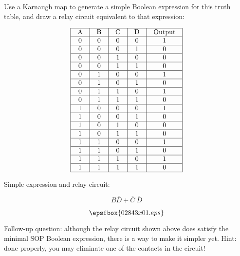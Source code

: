 

Use a Karnaugh map to generate a simple Boolean expression for this truth table, and draw a relay circuit equivalent to that expression:


$$\vbox{\offinterlineskip
\halign{\strut
\vrule \quad\hfil # \ \hfil & 
\vrule \quad\hfil # \ \hfil & 
\vrule \quad\hfil # \ \hfil & 
\vrule \quad\hfil # \ \hfil & 
\vrule \quad\hfil # \ \hfil \vrule \cr
\noalign{\hrule}
%
A & B & C & D & Output \cr
%
\noalign{\hrule}
%
0 & 0 & 0 & 0 & 1 \cr
%
\noalign{\hrule}
%
0 & 0 & 0 & 1 & 0 \cr
%
\noalign{\hrule}
%
0 & 0 & 1 & 0 & 0 \cr
%
\noalign{\hrule}
%
0 & 0 & 1 & 1 & 0 \cr
%
\noalign{\hrule}
%
0 & 1 & 0 & 0 & 1 \cr
%
\noalign{\hrule}
%
0 & 1 & 0 & 1 & 0 \cr
%
\noalign{\hrule}
%
0 & 1 & 1 & 0 & 1 \cr
%
\noalign{\hrule}
%
0 & 1 & 1 & 1 & 0 \cr
%
\noalign{\hrule}
%
1 & 0 & 0 & 0 & 1 \cr
%
\noalign{\hrule}
%
1 & 0 & 0 & 1 & 0 \cr
%
\noalign{\hrule}
%
1 & 0 & 1 & 0 & 0 \cr
%
\noalign{\hrule}
%
1 & 0 & 1 & 1 & 0 \cr
%
\noalign{\hrule}
%
1 & 1 & 0 & 0 & 1 \cr
%
\noalign{\hrule}
%
1 & 1 & 0 & 1 & 0 \cr
%
\noalign{\hrule}
%
1 & 1 & 1 & 0 & 1 \cr
%
\noalign{\hrule}
%
1 & 1 & 1 & 1 & 0 \cr
%
\noalign{\hrule}
} %
}$$ %







Simple expression and relay circuit:

$$B\overline{D} + \overline{C} \> \overline{D}$$

$$\epsfbox{02843x01.eps}$$

\vskip 10pt

Follow-up question: although the relay circuit shown above does satisfy the minimal SOP Boolean expression, there is a way to make it simpler yet.  Hint: done properly, you may eliminate one of the contacts in the circuit!

